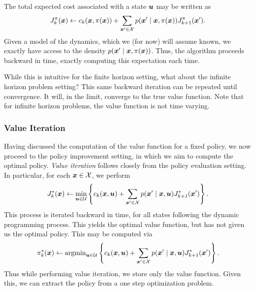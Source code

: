 The total expected cost associated with a state $\bm{u}$ may be written as 
\begin{equation}
    J_k^{\pi}(\bm{x}) \gets c_k(\bm{x}, \pi(\bm{x})) + \sum_{\bm{x}' \in \mathcal{X}} p(\bm{x}' \mid \bm{x}, \pi(\bm{x})) J^{\pi}_{k+1}(\bm{x}'). 
\end{equation}
Given a model of the dynamics, which we (for now) will assume known, we exactly have access to the density $p(\bm{x}' \mid \bm{x}, \pi(\bm{x}))$. Thus, the algorithm proceeds backward in time, exactly computing this expectation each time. 

While this is intuitive for the finite horizon setting, what about the infinite horizon problem setting? This same backward iteration can be repeated until convergence. It will, in the limit, converge to the true value function. Note that for infinite horizon problems, the value function is not time varying.

\subsubsection{Value Iteration}

Having discussed the computation of the value function for a fixed policy, we now proceed to the policy improvement setting, in which we aim to compute the optimal policy. \textit{Value iteration} follows closely from the policy evaluation setting. In particular, for each $\bm{x} \in \mathcal{X}$, we perform
\begin{equation}
    J^*_k(\bm{x}) \gets \min_{\bm{u} \in \mathcal{U}} \left\{c_k(\bm{x}, \bm{u}) + \sum_{\bm{x}' \in \mathcal{X}} p(\bm{x}' \mid \bm{x}, \bm{u}) J^*_{k+1}(\bm{x}') \right\}. \label{eq:value_itr}
\end{equation}
This process is iterated backward in time, for all states following the dynamic programming process. This yields the optimal value function, but has not given us the optimal policy. This may be computed via 
\begin{equation}
    \pi^*_k(\bm{x}) \gets \text{argmin}_{\bm{u} \in \mathcal{U}} \left\{c_k(\bm{x}, \bm{u}) + \sum_{\bm{x}' \in \mathcal{X}} p(\bm{x}' \mid \bm{x}, \bm{u}) J^*_{k+1}(\bm{x}') \right\}. 
\end{equation}
Thus while performing value iteration, we store only the value function. Given this, we can extract the policy from a one step optimization problem. 

